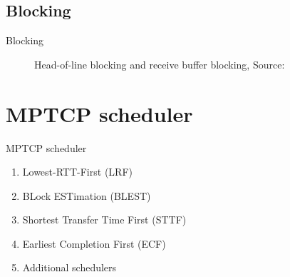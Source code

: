 \documentclass{beamer}
\begin{document}
\subsection{Blocking}
\begin{frame}{Blocking}
  \begin{figure}
    \centering
    \caption{\footnotesize Head-of-line blocking and receive buffer blocking, \textcolor{uos-grey-full}{Source: {\cite{blocking}}}}
  \end{figure}
\end{frame}


\section{MPTCP scheduler}
\begin{frame}{MPTCP scheduler}

  \begin{enumerate}
    \setlength\itemsep{1.6em}
    \item Lowest-RTT-First (LRF)
    \item BLock ESTimation (BLEST)
    \item Shortest Transfer Time First (STTF)
    \item Earliest Completion First (ECF)
    \item Additional schedulers
  \end{enumerate}
\end{frame}


\end{document}
